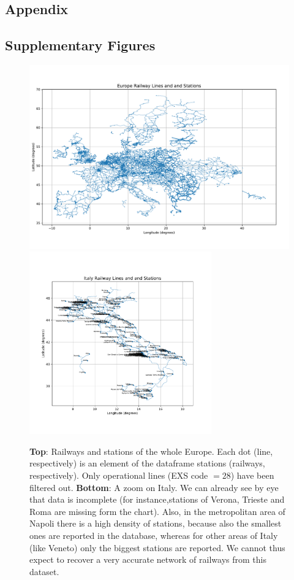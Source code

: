\subsection*{Appendix}
\subsection*{Supplementary Figures}
\begin{figure}[H]
    \centering
    \includegraphics[width = 0.8 \textwidth]{latex_source/images/railways/europe.pdf}
    \includegraphics[width = 0.7\textwidth]{latex_source/images/railways/italy.pdf}
    \caption{\textbf{Top}: Railways and stations of the whole Europe. Each dot (line, respectively) is an element of the dataframe stations (railways, respectively). Only operational lines (EXS code $= 28$) have been filtered out. \textbf{Bottom}: A zoom on Italy. We can already see by eye that data is incomplete (for instance,stations of Verona, Trieste and Roma are missing form the chart). Also, in the metropolitan area of Napoli there is a high density of stations, because also the smallest ones are reported in the database, whereas for other areas of Italy (like Veneto) only the biggest stations are reported. We cannot thus expect to recover a very accurate network of railways from this dataset.}
\label{fig:rails_preliminary}
\end{figure}
